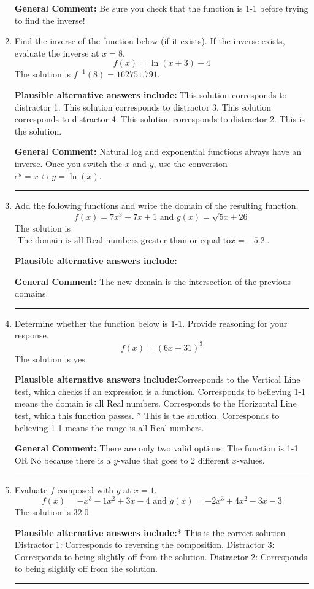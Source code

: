 \documentclass{extbook}[14pt]
\newcommand{\litem}[1]{\item #1

\rule{\textwidth}{0.4pt}}
\begin{document}
\begin{enumerate}
{\textbf{General Comment:} Be sure you check that the function is 1-1 before trying to find the inverse!
}
\litem{
Find the inverse of the function below (if it exists). If the inverse exists, evaluate the inverse at $x = 8$.
\[ f(x) = \ln{(x+3)}-4 \]The solution is \( f^{-1}(8) = 162751.791 \).\begin{enumerate}[label=\Alph*.]
\textbf{Plausible alternative answers include:} This solution corresponds to distractor 1.
 This solution corresponds to distractor 3.
 This solution corresponds to distractor 4.
 This solution corresponds to distractor 2.
 This is the solution.
\end{enumerate}

\textbf{General Comment:} Natural log and exponential functions always have an inverse. Once you switch the $x$ and $y$, use the conversion $ e^y = x \leftrightarrow y=\ln(x)$.
}
\litem{
Add the following functions and write the domain of the resulting function.
\[ f(x) = 7x^{3} +7 x + 1 \text{ and } g(x) = \sqrt{5x+26}  \]The solution is \( \text{ The domain is all Real numbers greater than or equal to} x = -5.2. \).\begin{enumerate}[label=\Alph*.]
\textbf{Plausible alternative answers include:}




\end{enumerate}

\textbf{General Comment:} The new domain is the intersection of the previous domains.
}
\litem{
Determine whether the function below is 1-1. Provide reasoning for your response.
\[ f(x) = (6 x + 31)^3 \]The solution is \( \text{yes} \).\begin{enumerate}[label=\Alph*.]
\textbf{Plausible alternative answers include:}Corresponds to the Vertical Line test, which checks if an expression is a function.
Corresponds to believing 1-1 means the domain is all Real numbers.
Corresponds to the Horizontal Line test, which this function passes.
* This is the solution.
Corresponds to believing 1-1 means the range is all Real numbers.
\end{enumerate}

\textbf{General Comment:} There are only two valid options: The function is 1-1 OR No because there is a $y$-value that goes to 2 different $x$-values.
}
\litem{
Evaluate $f$ composed with $g$ at $x=1$.
\[ f(x) = -x^{3} -1 x^{2} +3 x -4 \text{ and } g(x) = -2x^{3} +4 x^{2} -3 x -3 \]The solution is \( 32.0 \).\begin{enumerate}[label=\Alph*.]
\textbf{Plausible alternative answers include:}* This is the correct solution
 Distractor 1: Corresponds to reversing the composition.
 Distractor 3: Corresponds to being slightly off from the solution.
 Distractor 2: Corresponds to being slightly off from the solution.


\end{enumerate}}
\end{enumerate}
\end{document}
